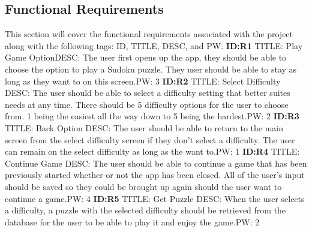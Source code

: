 \documentclass{article}
\begin{document}
 
\subsection{Functional Requirements}
This section will cover the functional requirements associated with the project along with the following tags: ID, TITLE, DESC, and PW. \newline \newline
\textbf{ID:R1} \newline TITLE: Play Game Option\newline DESC: The user first opens up the app, they should be able to choose the option to play a Sudoku puzzle. They user should be able to stay as long as they want to on this screen.\newline PW: 3 \newline \newline
\textbf{ID:R2} \newline TITLE: Select Difficulty \newline DESC: The user should be able to select a difficulty setting that better suites needs at any time. There should be 5 difficulty options for the user to choose from. 1 being the easiest all the way down to 5 being the hardest.\newline PW: 2 \newline \newline
\textbf{ID:R3} \newline TITLE: Back Option \newline DESC: The user should be able to return to the main screen from the select difficulty screen if they don't select a difficulty. The user can remain on the select difficulty as long as the want to.\newline PW: 1 \newline \newline
\textbf{ID:R4} \newline TITLE: Continue Game \newline DESC: The user should be able to continue a game that has been previously started whether or not the app has been closed. All of the user's input should be saved so they could be brought up again should the user want to continue a game.\newline PW: 4 \newline \newline
\textbf{ID:R5} \newline TITLE: Get Puzzle \newline DESC: When the user selects a difficulty, a puzzle with the selected difficulty should be retrieved from the database for the user to be able to play it and enjoy the game.\newline PW: 2 \newline \newline
\end{document}
